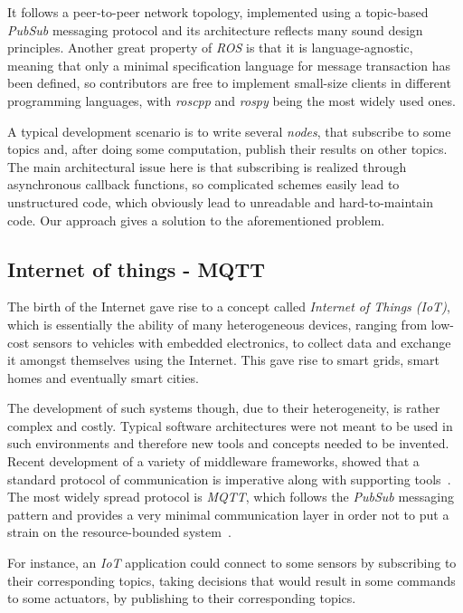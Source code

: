 \documentclass[sigplan,review,anonymous]{acmart}
\begin{document}
It follows a peer-to-peer network topology, implemented using a topic-based
\textit{PubSub} messaging protocol and its architecture reflects many sound
design principles. Another great property of \textit{ROS} is that it is
language-agnostic, meaning that only a minimal specification language for
message transaction has been defined, so contributors are free to implement
small-size clients in different programming languages, with \textit{roscpp} and
\textit{rospy} being the most widely used ones.

A typical development scenario is to write several \textit{nodes}, that
subscribe to some topics and, after doing some computation, publish their
results on other topics. The main architectural issue here is that subscribing
is realized through asynchronous callback functions, so complicated schemes
easily lead to unstructured code, which obviously lead to unreadable and
hard-to-maintain code. Our approach gives a solution to the aforementioned
problem.

\subsection{Internet of things - MQTT}

The birth of the Internet gave rise to a concept called \textit{Internet of
Things (IoT)}, which is essentially the ability of many heterogeneous devices,
ranging from low-cost sensors to vehicles with embedded electronics, to collect
data and exchange it amongst themselves using the Internet. This gave rise to
smart grids, smart homes and eventually smart cities.

The development of such systems though, due to their heterogeneity, is rather
complex and costly. Typical software architectures were not meant to be used in
such environments and therefore new tools and concepts needed to be invented.
Recent development of a variety of middleware frameworks, showed that a standard
protocol of communication is imperative along with supporting
tools~\cite{iot_middleware}. The most widely spread protocol is \textit{MQTT},
which follows the \textit{PubSub} messaging pattern and provides a very minimal
communication layer in order not to put a strain on the resource-bounded
system~\cite{mqtt}.

For instance, an \textit{IoT} application could connect to some sensors by
subscribing to their corresponding topics, taking decisions that would result in
some commands to some actuators, by publishing to their corresponding topics.
\end{document}
